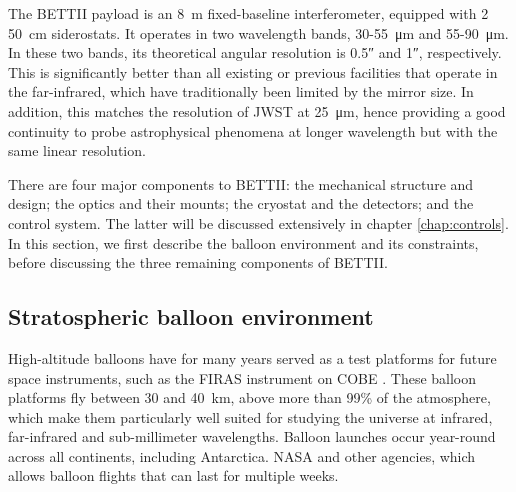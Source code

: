

The BETTII payload is an \SI{8}{\meter} fixed-baseline interferometer, equipped with 2 \SI{50}{\centi\meter} siderostats. It operates in two wavelength bands, 30-55~\si{\micro\meter} and 55-90~\si{\micro\meter}. In these two bands, its theoretical angular resolution is \ang{;;0.5} and \ang{;;1}, respectively. This is significantly better than all existing or previous facilities that operate in the far-infrared, which have traditionally been limited by the mirror size. In addition, this matches the resolution of JWST at \SI{25}{\micro\meter}, hence providing a good continuity to probe astrophysical phenomena at longer wavelength but with the same linear resolution.

There are four major components to BETTII: the mechanical structure and design; the optics and their mounts; the cryostat and the detectors; and the control system. The latter will be discussed extensively in chapter \ref{chap:controls}. In this section, we first describe the balloon environment and its constraints, before discussing the three remaining components of BETTII. 

\subsection{Stratospheric balloon environment}

High-altitude balloons have for many years served as a test platforms for future space instruments, such as the FIRAS instrument on COBE \citep{Fixsen:2002jv}. These balloon platforms fly between 30 and \SI{40}{\kilo\meter}, above more than 99\% of the atmosphere, which make them particularly well suited for studying the universe at infrared, far-infrared and sub-millimeter wavelengths. Balloon launches occur year-round across all continents, including Antarctica. NASA and other agencies, which allows balloon flights that can last for multiple weeks. 

